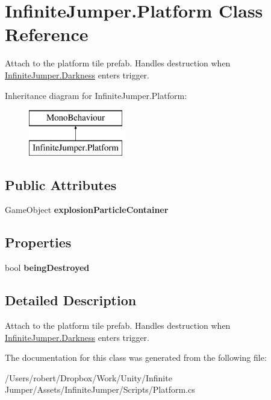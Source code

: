 \hypertarget{class_infinite_jumper_1_1_platform}{}\section{Infinite\+Jumper.\+Platform Class Reference}
\label{class_infinite_jumper_1_1_platform}


Attach to the platform tile prefab. Handles destruction when \hyperlink{class_infinite_jumper_1_1_darkness}{Infinite\+Jumper.\+Darkness} enters trigger.  


Inheritance diagram for Infinite\+Jumper.\+Platform\+:\begin{figure}[H]
\begin{center}
\leavevmode
\includegraphics[height=2.000000cm]{class_infinite_jumper_1_1_platform}
\end{center}
\end{figure}
\subsection*{Public Attributes}
\begin{DoxyCompactItemize}
\item 
\hypertarget{class_infinite_jumper_1_1_platform_a9a066af6ff2a15ac1c18656f290ee3ca}{}Game\+Object {\bfseries explosion\+Particle\+Container}\label{class_infinite_jumper_1_1_platform_a9a066af6ff2a15ac1c18656f290ee3ca}

\end{DoxyCompactItemize}
\subsection*{Properties}
\begin{DoxyCompactItemize}
\item 
\hypertarget{class_infinite_jumper_1_1_platform_a109c8e40667f24099d9f4341d3010f82}{}bool {\bfseries being\+Destroyed}\label{class_infinite_jumper_1_1_platform_a109c8e40667f24099d9f4341d3010f82}

\end{DoxyCompactItemize}


\subsection{Detailed Description}
Attach to the platform tile prefab. Handles destruction when \hyperlink{class_infinite_jumper_1_1_darkness}{Infinite\+Jumper.\+Darkness} enters trigger. 



The documentation for this class was generated from the following file\+:\begin{DoxyCompactItemize}
\item 
/\+Users/robert/\+Dropbox/\+Work/\+Unity/\+Infinite Jumper/\+Assets/\+Infinite\+Jumper/\+Scripts/Platform.\+cs\end{DoxyCompactItemize}
